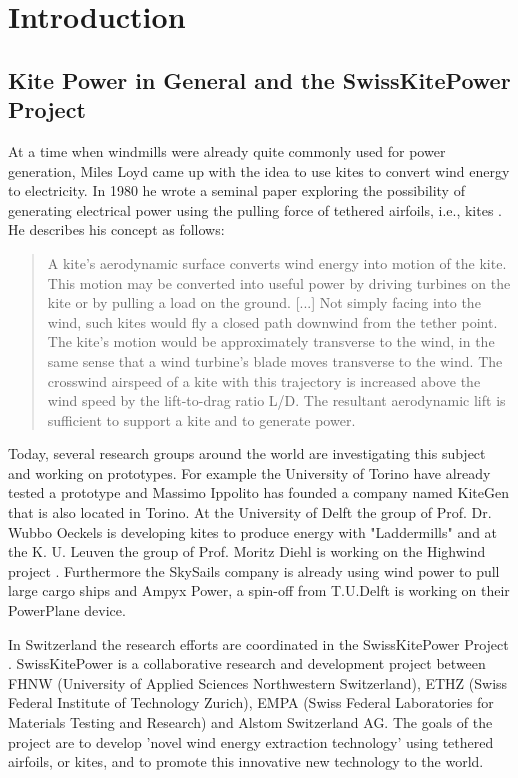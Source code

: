 \chapter{Introduction}\label{cha1}
\section{Kite Power in General and the SwissKitePower Project}
At a time when windmills were already quite commonly used for power generation, Miles Loyd came up with the idea to use kites to convert wind energy to electricity.  In 1980 he wrote a seminal paper exploring the possibility of generating electrical power using the pulling force of tethered airfoils, i.e., kites \cite{loyd1980}. He describes his concept as follows:
\begin{quote} A kite's aerodynamic surface converts wind energy into motion of the kite. This motion may be converted into useful
power by driving turbines on the kite or by pulling a load on the ground. [...] Not simply facing into the wind, such kites would fly a closed path downwind from the tether point. The kite's motion would be approximately transverse to the wind, in the same sense that a wind turbine's blade moves transverse to the wind. The crosswind airspeed of a kite with this trajectory is increased above the wind speed by the lift-to-drag ratio L/D. The resultant aerodynamic lift is sufficient to support a kite and to generate power. \cite{loyd1980}\end{quote}
Today, several research groups around the world are investigating this subject and working on prototypes. For example the University of Torino have already tested a prototype \cite{canale2006} and Massimo Ippolito has founded a company named KiteGen that is also located in Torino. At the University of Delft the group of Prof. Dr. Wubbo Oeckels is developing kites to produce energy with "Laddermills" \cite{schmehl2012} and at the K. U. Leuven the group of Prof. Moritz Diehl is working on the Highwind project \cite{geebelen2012}. Furthermore the SkySails company is already using wind power to pull large cargo ships \cite{erhard2012} and Ampyx Power, a spin-off from T.U.Delft is working on their PowerPlane device.

In Switzerland the research efforts are coordinated in the SwissKitePower Project \cite{skp}. SwissKitePower is a collaborative research and development project between FHNW (University of Applied Sciences Northwestern Switzerland), ETHZ (Swiss Federal Institute of Technology Zurich), EMPA (Swiss Federal Laboratories for Materials Testing and Research) and Alstom Switzerland AG. The goals of the project are to develop 'novel wind energy extraction technology' using tethered airfoils, or kites, and to promote this innovative new technology to the world.

